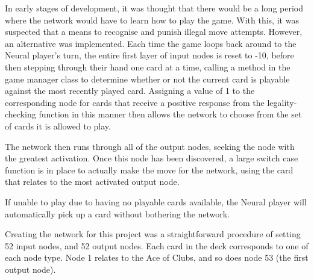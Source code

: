 \documentclass[12pt,a4paper]{article}
\begin{document}
In early stages of development, it was thought that there would be a long period where the network would have to learn how to play the game. With this, it was suspected that a means to recognise and punish illegal move attempts. However, an alternative was implemented. Each time the game loops back around to the Neural player's turn, the entire first layer of input nodes is reset to -10, before then stepping through their hand one card at a time, calling a method in the game manager class to determine whether or not the current card is playable against the most recently played card. Assigning a value of 1 to the corresponding node for cards that receive a positive response from the legality-checking function in this manner then allows the network to choose from the set of cards it is allowed to play.

The network then runs through all of the output nodes, seeking the node with the greatest activation. Once this node has been discovered, a large switch case function is in place to actually make the move for the network, using the card that relates to the most activated output node. 

If unable to play due to having no playable cards available, the Neural player will automatically pick up a card without bothering the network.

Creating the network for this project was a straightforward procedure of setting 52 input nodes, and 52 output nodes. Each card in the deck corresponds to one of each node type. Node 1 relates to the Ace of Clubs, and so does node 53 (the first output node). 

\newpage
\end{document}
